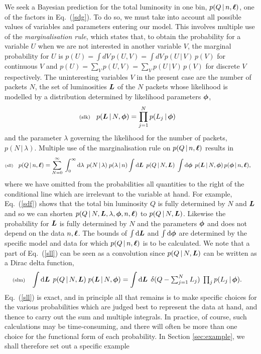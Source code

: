 \documentclass[11pt]{article}
\newcommand{\lleq}[1]{\label{#1} }
\renewcommand{\lleq}[1]{\label{#1} {\scriptstyle {\rm (#1)}} \hspace*{2ex} }
\newcommand{\cond}{\,|\,}
\newcommand{\rmdx}[1]{\dd{#1}} %
\begin{document}
We seek a Bayesian prediction for the total luminosity in one bin,
$p(Q\cond n,\bml)$, one of the factors in Eq.~(\ref{sdg}).  To do so,
we must take into account all possible values of variables and
parameters entering our model.  This involves multiple use of the
\textit{marginalisation rule}, which states that, to obtain the
probability for a variable $U$ when we are not interested in another
variable $V$, the marginal probability for $U$ is %
$p(U) = \int dV\,p(U,V) = \int dV\,p(U\cond V)\,p(V)$ for continuous
$V$ and $p(U) = \sum_V p(U,V) = \sum_V p(U\cond V)\,p(V)$ for discrete
$V$ respectively.
%
The uninteresting variables $V$ in the present case are the number of
packets $N$, the set of luminosities ${\bm{L}}$ of the $N$ packets
whose likelihood is modelled by a distribution determined by
likelihood parameters ${\bm{\phi}}$,
\begin{align}
  \lleq{slk}
  p(\bmL\cond N,\bmphi)
  &= \prod_{j=1}^{N} p(L_j\cond \bmphi)
\end{align}
and the parameter $\lambda$ governing the likelihood for the number of
packets, $p(N\cond\lambda)$. Multiple use of the marginalisation rule
on $p(Q\cond n,\bml)$ results in
\begin{align}
  \lleq{sll}
  p(Q\cond n,\bml)
  &= \sum_{N=0}^\infty \;\int_0^\infty \rmdx{\lambda}\;
    p(N\cond\lambda)\;
    p(\lambda\cond n)
    \int \rmdx{\bmL}\;
    p(Q\cond N,\bmL)\;
    \int \rmdx{\bmphi}\;
    p(\bmL\cond N,\bmphi)\,
    p(\bmphi\cond n,\bml),
\end{align}
where we have omitted from the probabilities all quantities to the
right of the conditional line which are irrelevant to the variable at
hand. For example, Eq.~(\ref{sdf}) shows that the total bin luminosity
$Q$ is fully determined by $N$ and ${\bm{L}}$ and so we can shorten
$p(Q\cond N,\bmL,\lambda,\bmphi,n,\bml)$ to $p(Q\cond N,\bmL)$. %
Likewise the probability for ${\bm{L}}$ is fully determined by $N$ and the
parameters ${\bm{\phi}}$ and does not depend on the data $n,{\bm{\ell}}$.  The
bounds of $\int \rmdx{\bmL}$ and $\int \rmdx{\bmphi}$ are determined by the
specific model and data for which $p(Q\cond n,\bml)$ is to be
calculated.
%
We note that a part of Eq.~(\ref{sll}) can be seen as a convolution
since $p(Q\cond N,\bmL)$ can be written as a Dirac delta function,
\begin{align}
  \lleq{slm}
  \int \rmdx{\bmL}\; p(Q\cond N,\bmL)\; p(\bmL\cond N,\bmphi)
  &= \int \rmdx{\bmL}\;\delta(Q - \textstyle\sum_{j=1}^N L_j)\; \prod_j p(L_j\cond \bmphi).
\end{align}
Eq.~(\ref{sll}) is exact, and in principle all that remains is to make
specific choices for the various probabilities which are judged best
to represent the data at hand, and thence to carry out the sum and
multiple integrals. In practice, of course, such calculations may be
time-consuming, and there will often be more than one choice for the
functional form of each probability. In Section \ref{sec:example}, we
shall therefore set out a specific example
\end{document}
